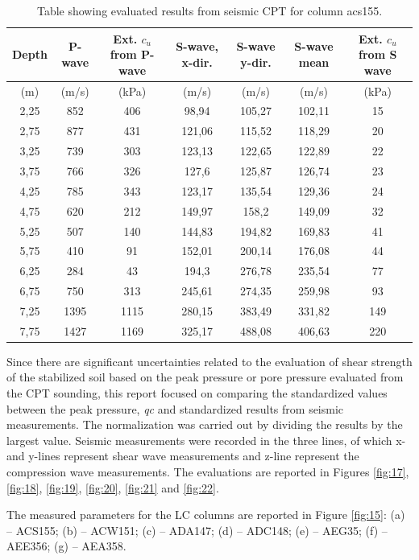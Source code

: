 \documentclass[final,3p,times,twocolumn]{elsarticle}
\begin{document}
\begin{table}[t]
  \caption{Table showing evaluated results from seismic CPT for column acs155.}
  \centering
  \begin{tabular}{| c c c c c c c |}                         
    Depth & P-wave & Ext. $c_u$ from P-wave & S-wave, x-dir. & S-wave y-dir. & S-wave mean & Ext. $c_u$ from S wave \\ \hline 
    (m) & (m/s) & (kPa) & (m/s) & (m/s) & (m/s) & (kPa) \\ \hline
    2,25 & 852 & 406 & 98,94 & 105,27 & 102,11 & 15 \\
    2,75 & 877 & 431 & 121,06 & 115,52 & 118,29 & 20 \\
    3,25 & 739 & 303 & 123,13 & 122,65 & 122,89 & 22 \\
    3,75 & 766 & 326 & 127,6 & 125,87 & 126,74 & 23 \\
    4,25 & 785 & 343 & 123,17 & 135,54 & 129,36 & 24 \\
    4,75 & 620 & 212 & 149,97 & 158,2 & 149,09 & 32 \\
    5,25 & 507 & 140 & 144,83 & 194,82 & 169,83 & 41 \\
    5,75 & 410 & 91 & 152,01 & 200,14 & 176,08 & 44 \\
    6,25 & 284 & 43 & 194,3 & 276,78 & 235,54 & 77 \\
    6,75 & 750 & 313 & 245,61 & 274,35 & 259,98 & 93 \\
    7,25 & 1395 & 1115 & 280,15 & 383,49 & 331,82 & 149 \\
    7,75 & 1427 & 1169 & 325,17 & 488,08 & 406,63 & 220
  \end{tabular}
  \label{tab:2}
\end{table}


Since there are significant uncertainties related to the evaluation of shear strength of the stabilized soil based on the peak pressure or pore pressure evaluated from the CPT sounding, this report focused on comparing the standardized values between the peak pressure, \emph{qc} and standardized results from seismic measurements. The normalization was carried out by dividing the results by the largest value. Seismic measurements were recorded in the three lines, of which x- and y-lines represent shear wave measurements and z-line represent the compression wave measurements. The evaluations are reported in Figures \ref{fig:17}, \ref{fig:18}, \ref{fig:19}, \ref{fig:20}, \ref{fig:21} and \ref{fig:22}.  

The measured parameters for the LC columns are reported in Figure \ref{fig:15}: (a) -- ACS155; (b) -- ACW151; (c) -- ADA147; (d) -- ADC148; (e) -- AEG35; (f) -- AEE356; (g) -- AEA358.
\end{document}
